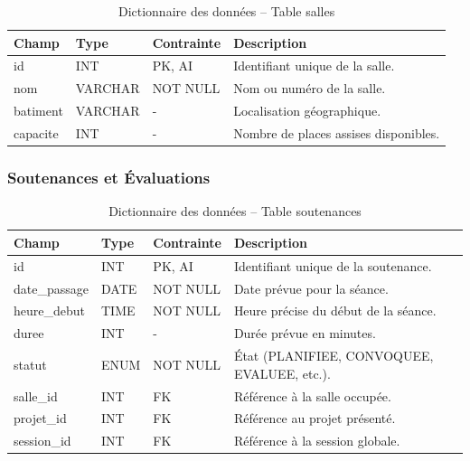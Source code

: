 \documentclass[12pt,a4paper]{article}
\begin{document}
\begin{table}[H]
    \centering
    \small
    \begin{tabular}{lp{2cm}lp{6cm}}
        \toprule
        \rowcolor{primary!10}
        \textbf{Champ} & \textbf{Type} & \textbf{Contrainte} & \textbf{Description} \\
        \midrule
        id & INT & PK, AI & Identifiant unique de la salle. \\
        nom & VARCHAR & NOT NULL & Nom ou numéro de la salle. \\
        batiment & VARCHAR & - & Localisation géographique. \\
        capacite & INT & - & Nombre de places assises disponibles. \\
        \bottomrule
    \end{tabular}
    \caption{Dictionnaire des données -- Table salles}
\end{table}

\subsubsection{Soutenances et Évaluations}

\begin{table}[H]
    \centering
    \small
    \begin{tabular}{lp{2cm}lp{6cm}}
        \toprule
        \rowcolor{primary!10}
        \textbf{Champ} & \textbf{Type} & \textbf{Contrainte} & \textbf{Description} \\
        \midrule
        id & INT & PK, AI & Identifiant unique de la soutenance. \\
        date\_passage & DATE & NOT NULL & Date prévue pour la séance. \\
        heure\_debut & TIME & NOT NULL & Heure précise du début de la séance. \\
        duree & INT & - & Durée prévue en minutes. \\
        statut & ENUM & NOT NULL & État (PLANIFIEE, CONVOQUEE, EVALUEE, etc.). \\
        salle\_id & INT & FK & Référence à la salle occupée. \\
        projet\_id & INT & FK & Référence au projet présenté. \\
        session\_id & INT & FK & Référence à la session globale. \\
        \bottomrule
    \end{tabular}
    \caption{Dictionnaire des données -- Table soutenances}
\end{table}
\end{document}
